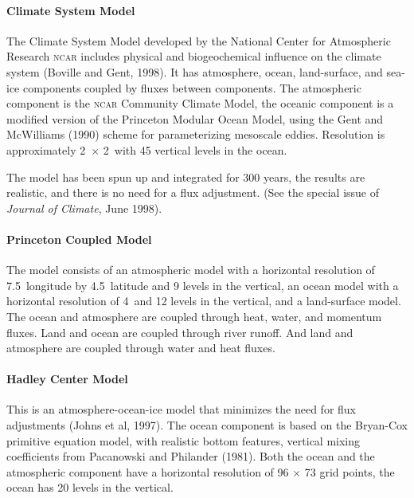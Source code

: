 \paragraph{Climate System Model} The Climate System Model developed by the National
Center for
Atmospheric Research \textsc{ncar} includes physical and
biogeochemical influence on the climate system (Boville and Gent,
1998). It has atmosphere, ocean, land-surface, and sea-ice components
coupled by fluxes between components. The atmospheric component is the
\textsc{ncar} Community Climate Model, the oceanic component is a
modified version of the Princeton Modular Ocean Model, using the Gent
and McWilliams (1990) scheme for parameterizing mesoscale
eddies. Resolution is approximately
2\degrees\ $\times$ 2\degrees\ with 45 vertical levels in the ocean.

The model has been spun up and integrated for 300 years, the results
are realistic, and there is no need for a flux
adjustment. (See
the special issue of \textit{Journal of Climate}, June 1998).

\paragraph{Princeton Coupled Model} The model consists of an atmospheric model with
a
horizontal resolution of 7.5\degrees\ longitude by
4.5\degrees\ latitude and 9 levels in the vertical, an ocean model
with a horizontal resolution of 4\degrees\ and 12 levels in the
vertical, and a land-surface model. The ocean and atmosphere are
coupled through heat, water, and momentum fluxes. Land and ocean are
coupled through river runoff.  And land and atmosphere are coupled
through water and heat fluxes.

\paragraph{Hadley Center Model} This is an atmosphere-ocean-ice model that minimizes the need for flux
adjustments (Johns
et al, 1997). The ocean component is based on the Bryan-Cox primitive
equation model, with realistic bottom features, vertical mixing
coefficients from Pacanowski and Philander (1981). Both the
ocean and the atmospheric component have a horizontal resolution of 96
$\times$ 73 grid points, the ocean has 20 levels in the vertical.


